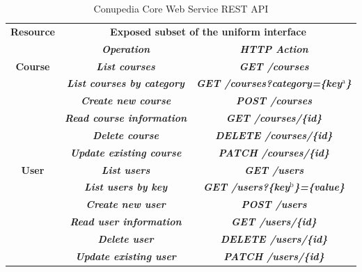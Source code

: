 \documentclass[conference]{IEEEtran}
\begin{document}
            \newpage
            \begin{table}[H]
                \caption{Conupedia Core Web Service REST API}
                \begin{center}
                    \begin{tabular}{|c|c|c|}
                        \hline
                        \textbf{Resource}& \multicolumn{2}{|c|}{\textbf{Exposed subset of the uniform interface}}\\
                        \cline{2-3} 
                        \textbf{} & \textbf{\textit{Operation}}& \textbf{\textit{HTTP Action}}\\
                        \cline{1-3} 
                        \textbf{Course} & \textbf{\textit{List courses}}& \textbf{\textit{GET /courses }}\\
                        \textbf{} & \textbf{\textit{List courses by category}}& \textbf{\textit{GET /courses?category=\{key$^{\mathrm{a}}$\} }}\\
                        \textbf{} & \textbf{\textit{Create new course}}& \textbf{\textit{POST /courses }}\\
                        \textbf{} & \textbf{\textit{Read course information}}& \textbf{\textit{GET /courses/\{id\} }}\\
                        \textbf{} & \textbf{\textit{Delete course}}& \textbf{\textit{DELETE /courses/\{id\} }}\\
                        \textbf{} & \textbf{\textit{Update existing course}}& \textbf{\textit{PATCH /courses/\{id\} }}\\
                        
                        \cline{1-3}
                        \textbf{User} & \textbf{\textit{List users}}& \textbf{\textit{GET /users }}\\
                        \textbf{} & \textbf{\textit{List users by key}}& \textbf{\textit{GET /users?\{key$^{\mathrm{b}}$\}=\{value\} }}\\
                        \textbf{} & \textbf{\textit{Create new user}}& \textbf{\textit{POST /users }}\\
                        \textbf{} & \textbf{\textit{Read user information}}& \textbf{\textit{GET /users/\{id\} }}\\
                        \textbf{} & \textbf{\textit{Delete user}}& \textbf{\textit{DELETE /users/\{id\} }}\\
                        \textbf{} & \textbf{\textit{Update existing user}}& \textbf{\textit{PATCH /users/\{id\} }}\\
                        

\end{tabular}
\end{center}
\end{table}
\end{document}
